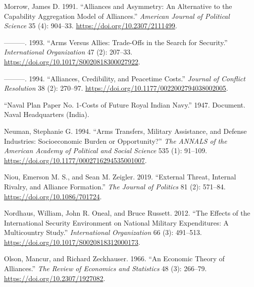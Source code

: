 \documentclass[
  12,
  letterpaper,
  DIV=11,
  numbers=noendperiod]{scrartcl}
\newlength{\cslhangindent}
\newlength{\cslentryspacingunit} %
\newenvironment{CSLReferences}[2] %
 {%
  \setlength{\parindent}{0pt}
  \ifodd #1
  \let\oldpar\par
  \def\par{\hangindent=\cslhangindent\oldpar}
  \fi
  \setlength{\parskip}{#2\cslentryspacingunit}
 }%
 {}
\begin{document}
\begin{CSLReferences}{1}{0}
\leavevmode{}%
Morrow, James D. 1991. {``Alliances and {Asymmetry}: {An Alternative} to
the {Capability Aggregation Model} of {Alliances}.''} \emph{American
Journal of Political Science} 35 (4): 904--33.
\url{https://doi.org/10.2307/2111499}.

\leavevmode{}%
---------. 1993. {``Arms Versus Allies: Trade-Offs in the Search for
Security.''} \emph{International Organization} 47 (2): 207--33.
\url{https://doi.org/10.1017/S0020818300027922}.

\leavevmode{}%
---------. 1994. {``Alliances, {Credibility}, and {Peacetime Costs}.''}
\emph{Journal of Conflict Resolution} 38 (2): 270--97.
\url{https://doi.org/10.1177/0022002794038002005}.

\leavevmode{}%
{``Naval {Plan Paper No}. 1-{Costs} of {Future Royal Indian Navy}.''}
1947. Document. {Naval Headquarters (India)}.

\leavevmode{}%
Neuman, Stephanie G. 1994. {``Arms {Transfers}, {Military Assistance},
and {Defense Industries}: {Socioeconomic Burden} or {Opportunity}?''}
\emph{The ANNALS of the American Academy of Political and Social
Science} 535 (1): 91--109.
\url{https://doi.org/10.1177/0002716294535001007}.

\leavevmode{}%
Niou, Emerson M. S., and Sean M. Zeigler. 2019. {``External {Threat},
{Internal Rivalry}, and {Alliance Formation}.''} \emph{The Journal of
Politics} 81 (2): 571--84. \url{https://doi.org/10.1086/701724}.

\leavevmode{}%
Nordhaus, William, John R. Oneal, and Bruce Russett. 2012. {``The
{Effects} of the {International Security Environment} on {National
Military Expenditures}: {A Multicountry Study}.''} \emph{International
Organization} 66 (3): 491--513.
\url{https://doi.org/10.1017/S0020818312000173}.

\leavevmode{}%
Olson, Mancur, and Richard Zeckhauser. 1966. {``An {Economic Theory} of
{Alliances}.''} \emph{The Review of Economics and Statistics} 48 (3):
266--79. \url{https://doi.org/10.2307/1927082}.


\end{CSLReferences}
\end{document}
